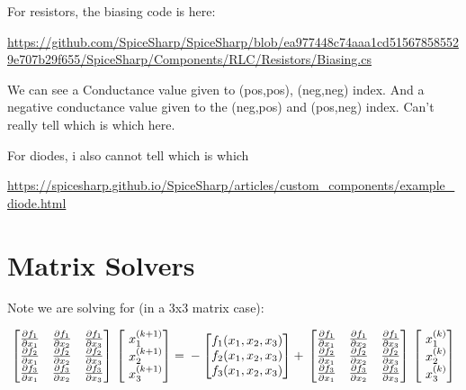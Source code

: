 \documentclass[12pt]{article}
\renewcommand{\_}{\kern-1.5pt\textunderscore\kern-1.5pt}
\begin{document}
For resistors, the biasing code is here:

\url{https://github.com/SpiceSharp/SpiceSharp/blob/ea977448c74aaa1cd515678585529e707b29f655/SpiceSharp/Components/RLC/Resistors/Biasing.cs}

We can see a Conductance value given to (pos,pos), (neg,neg) index. And a negative conductance value given to the (neg,pos) and (pos,neg) index. Can't really tell which is which here.

For diodes, i also cannot tell which is which

\url{https://spicesharp.github.io/SpiceSharp/articles/custom_components/example_diode.html}


\part{Matrix Solvers}
Note we are solving for (in a 3x3 matrix case):



$$ \begin{bmatrix}
\frac{\partial f_1}{\partial x_1}  & \frac{\partial f_1}{\partial x_2}  & \frac{\partial f_1}{\partial x_3} \\
\frac{\partial f_2}{\partial x_1}  & \frac{\partial f_2}{\partial x_2}  & \frac{\partial f_2}{\partial x_3} \\
\frac{\partial f_3}{\partial x_1}  & \frac{\partial f_3}{\partial x_2}  & \frac{\partial f_3}{\partial x_3} 
\end{bmatrix} \\ 
\begin{bmatrix}
\ x_1^{(k+1)}  \\
\ x_2^{(k+1)} \\
\ x_3^{(k+1)} 
\end{bmatrix} = \\
-\begin{bmatrix}
f_1 (x_1,x_2,x_3) \\
f_2 (x_1,x_2,x_3) \\
f_3 (x_1,x_2,x_3)
\end{bmatrix} + \\
\begin{bmatrix}
\frac{\partial f_1}{\partial x_1}  & \frac{\partial f_1}{\partial x_2}  & \frac{\partial f_1}{\partial x_3} \\
\frac{\partial f_2}{\partial x_1}  & \frac{\partial f_2}{\partial x_2}  & \frac{\partial f_2}{\partial x_3} \\
\frac{\partial f_3}{\partial x_1}  & \frac{\partial f_3}{\partial x_2}  & \frac{\partial f_3}{\partial x_3} 
\end{bmatrix} \\
\begin{bmatrix}
\ x_1^{(k)} \\
\ x_2^{(k)}\\
\ x_3^{(k)}
\end{bmatrix}
$$
\end{document}
